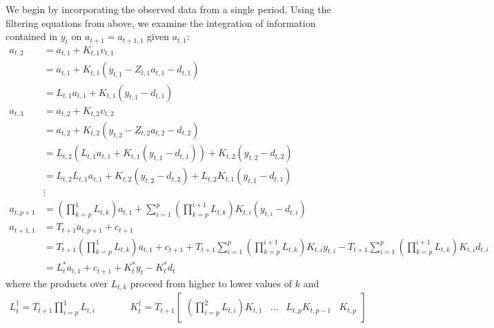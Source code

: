 \documentclass[12pt]{article}
\begin{document}
	We begin by incorporating the observed data from a single period. Using the filtering equations from above, we examine the integration of information contained in $y_t$ on $a_{t+1} = a_{t+1,1}$ given $a_{t,1}$:
	\begin{align*}
	a_{t,2} &= a_{t,1} + K_{t,1} v_{t,1} \\
			&= a_{t,1} + K_{t,1} (y_{t,1} - Z_{t,1} a_{t,1} - d_{t,1}) \\
			&= L_{t,1} a_{t,1} + K_{t,1} (y_{t,1} - d_{t,1}) \\
	a_{t,3} &= a_{t,2} + K_{t,2} v_{t,2} \\
			&= a_{t,2} + K_{t,2} (y_{t,2} - Z_{t,2} a_{t,2} - d_{t,2}) \\
			&= L_{t,2} (L_{t,1} a_{t,1} + K_{t,1} (y_{t,1} - d_{t,1})) + K_{t,2} (y_{t,2} - d_{t,2}) \\
			&= L_{t,2} L_{t,1} a_{t,1} + K_{t,2} (y_{t,2} - d_{t,2}) + L_{t,2} K_{t,1} (y_{t,1} - d_{t,1}) \\
			&\vdots \\
	a_{t,p+1} &= \left(\prod_{k=p}^1 L_{t,k} \right) a_{t,1} + \sum_{i=1}^p \left(\prod_{k=p}^{i+1} L_{t,k} \right) K_{t,i} (y_{t,i} - d_{t,i}) \\
	a_{t+1,1} &= T_{t+1} a_{t,p+1} + c_{t+1} \\
		&= T_{t+1} \left(\prod_{k=p}^1 L_{t,k} \right) a_{t,1} 
			 + c_{t+1}
			 + T_{t+1} \sum_{i=1}^p \left(\prod_{k=p}^{i+1} L_{t,k} \right) K_{t,i} y_{t,i} 
			 - T_{t+1} \sum_{i=1}^p \left(\prod_{k=p}^{i+1} L_{t,k} \right) K_{t,i} d_{t,i} \\
		&= L_t^* a_{t,1} + c_{t+1} + K_t^* y_t - K_t^* d_t 
	\end{align*}
	where the products over $L_{t,k}$ proceed from higher to lower values of $k$ and 
	\begin{align*}
	L_t^\dagger = T_{t+1} \prod_{i=p}^1 L_{t,i} & \qquad & 
	K_t^\dagger = T_{t+1} \begin{bmatrix} \left(\prod_{i=p}^{2} L_{t,i} \right) K_{t,1} &  \dots & L_{t,p} K_{t,p-1} & K_{t,p} \end{bmatrix}
	\end{align*}
	
\end{document}
